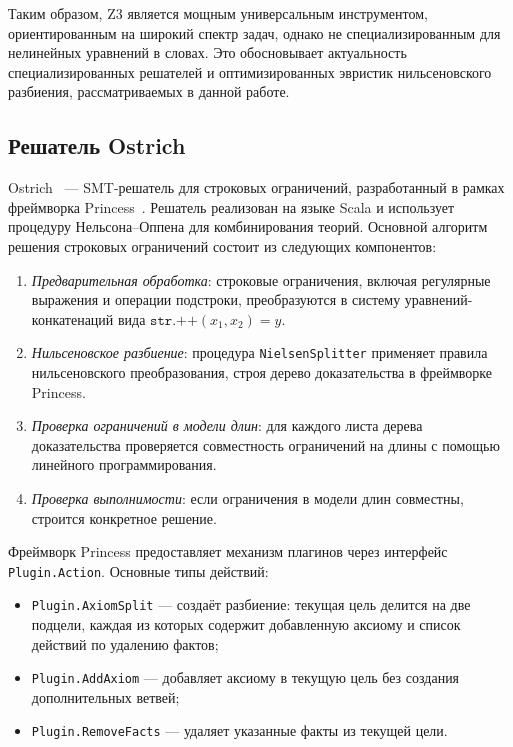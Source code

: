 \documentclass[14pt, russian]{scrartcl}
\begin{document}
Таким образом, Z3 является мощным универсальным инструментом, ориентированным
на широкий спектр задач, однако не специализированным для нелинейных уравнений
в словах. Это обосновывает актуальность специализированных решателей и
оптимизированных эвристик нильсеновского разбиения, рассматриваемых в
данной работе.

\subsection{Решатель Ostrich}

Ostrich~\cite{chen2022} --- SMT-решатель для строковых ограничений, разработанный в рамках
фреймворка Princess~\cite{ruemmer2008}. Решатель реализован на языке Scala и использует
процедуру Нельсона--Оппена для комбинирования теорий. Основной алгоритм решения
строковых ограничений состоит из следующих компонентов:

\begin{enumerate}
\item \textit{Предварительная обработка}: строковые ограничения, включая регулярные
  выражения и операции подстроки, преобразуются в систему уравнений-конкатенаций вида
  $\texttt{str.++}(x_1, x_2) = y$.
\item \textit{Нильсеновское разбиение}: процедура \texttt{NielsenSplitter} применяет
  правила нильсеновского преобразования, строя дерево доказательства в фреймворке
  Princess.
\item \textit{Проверка ограничений в модели длин}: для каждого листа дерева доказательства
  проверяется совместность ограничений на длины с помощью линейного программирования.
\item \textit{Проверка выполнимости}: если ограничения в модели длин совместны, строится
  конкретное решение.
\end{enumerate}

Фреймворк Princess предоставляет механизм плагинов через интерфейс
\texttt{Plugin.Action}. Основные типы действий:

\begin{itemize}
\item \texttt{Plugin.AxiomSplit} --- создаёт разбиение: текущая цель делится на две
  подцели, каждая из которых содержит добавленную аксиому и список действий по удалению
  фактов;
\item \texttt{Plugin.AddAxiom} --- добавляет аксиому в текущую цель без создания
  дополнительных ветвей;
\item \texttt{Plugin.RemoveFacts} --- удаляет указанные факты из текущей цели.
\end{itemize}
\end{document}
